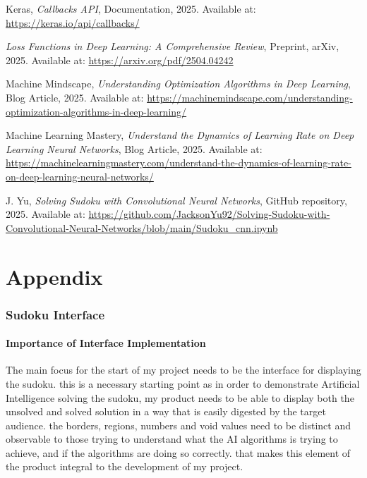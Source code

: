 \documentclass[]{final_report}
\begin{document}
\begin{thebibliography}{99}
 Keras, \textit{Callbacks API}, Documentation, 2025. Available at: \url{https://keras.io/api/callbacks/}

 \textit{Loss Functions in Deep Learning: A Comprehensive Review}, Preprint, arXiv, 2025. Available at: \url{https://arxiv.org/pdf/2504.04242}

 Machine Mindscape, \textit{Understanding Optimization Algorithms in Deep Learning}, Blog Article, 2025. Available at: \url{https://machinemindscape.com/understanding-optimization-algorithms-in-deep-learning/}

 Machine Learning Mastery, \textit{Understand the Dynamics of Learning Rate on Deep Learning Neural Networks}, Blog Article, 2025. Available at: \url{https://machinelearningmastery.com/understand-the-dynamics-of-learning-rate-on-deep-learning-neural-networks/}

 J. Yu, \textit{Solving Sudoku with Convolutional Neural Networks}, GitHub repository, 2025. Available at: \url{https://github.com/JacksonYu92/Solving-Sudoku-with-Convolutional-Neural-Networks/blob/main/Sudoku_cnn.ipynb}

\end{thebibliography}
\label{endpage}

\chapter*{Appendix}
\subsection*{Sudoku Interface}

\subsubsection{Importance of Interface Implementation}

The main focus for the start of my project needs to be the interface for displaying the sudoku. this is a necessary starting point as in order to demonstrate Artificial Intelligence solving the sudoku, my product needs to be able to display both the unsolved and solved solution in a way that is easily digested by the target audience. the borders, regions, numbers and void values need to be distinct and observable to those trying to understand what the AI algorithms is trying to achieve, and if the algorithms are doing so correctly. that makes this element of the product integral to the development of my project. 
\end{document}
